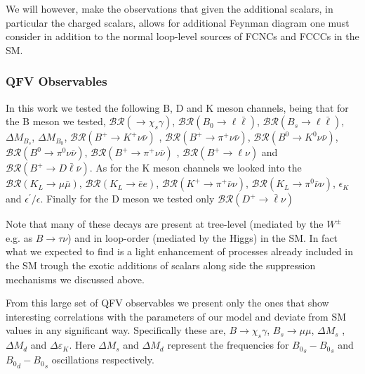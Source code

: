 We will however, make the observations that given the additional scalars, in particular the charged scalars, allows for additional Feynman diagram one must consider in addition to the normal loop-level sources of FCNCs and FCCCs in the SM. 
% 
%

\subsubsection{QFV Observables}

In this work we tested the following B, D and K meson channels, being that for the B meson we tested, 
$\mathcal{BR} \left( \rightarrow \chi_s \gamma \right)$, 
$\mathcal{BR} \left( B_0 \rightarrow \ell \bar{\ell} \right)$, 
$\mathcal{BR} \left( B_s \rightarrow \ell \bar{\ell} \right)$, 
$\Delta M_{B_s}$, 
$\Delta M_{B_0}$, 
$\mathcal{BR} \left( B^+ \rightarrow K^+\nu\bar{\nu} \right)$ , 
$\mathcal{BR} \left( B^+ \rightarrow \pi^+\nu\bar{\nu} \right)$, 
$\mathcal{BR} \left( B^0 \rightarrow K^0\nu\bar{\nu} \right)$,  
$\mathcal{BR} \left( B^0 \rightarrow \pi^0 \nu\bar{\nu} \right)$, 
$\mathcal{BR} \left( B^+ \rightarrow \pi^+\nu\bar{\nu} \right)$ , 
$\mathcal{BR} \left( B^+ \rightarrow \ell \nu \right)$ and
$\mathcal{BR} \left( B^+ \rightarrow D \bar{\ell} \bar{\nu} \right)$. 
%
As for the K meson channels we looked into the $\mathcal{BR} \left( K_L \rightarrow \mu \bar{\mu} \right)$,  $\mathcal{BR} \left( K_L \rightarrow \bar{e} e \right)$,  $\mathcal{BR} \left( K^+ \rightarrow \pi^+ \bar{\nu} \nu \right)$, $\mathcal{BR} \left( K_L \rightarrow \pi^0 \bar{\nu} \nu \right)$, $\epsilon_K$ and $\epsilon^\prime/\epsilon$. 
%
Finally for the D meson we tested only $\mathcal{BR} ( D^+ \rightarrow \bar{\ell} \nu ) $

Note that many of these decays are present at tree-level (mediated by the $W^\pm$ e.g. as $B \rightarrow \tau \nu$) and in loop-order (mediated by the Higgs) in the SM. 
%
In fact what we expected to find is a light enhancement of processes already included in the SM trough the exotic additions of scalars along side the suppression mechanisms we discussed above. 

From this large set of QFV observables we present only the ones that show interesting correlations with the parameters of our model and deviate from SM values in any significant way.
%
Specifically these are, $B \rightarrow \chi_s \gamma$, $B_s \rightarrow \mu \mu$, $\Delta M_s$ , $\Delta M_d$ and $\Delta \varepsilon_K$. 
%
Here $\Delta M_s$ and $\Delta M_d$ represent the frequencies for ${B_0}_s - {B_0}_s$ and ${B_0}_d - {B_0}_s$ oscillations respectively. 
 
